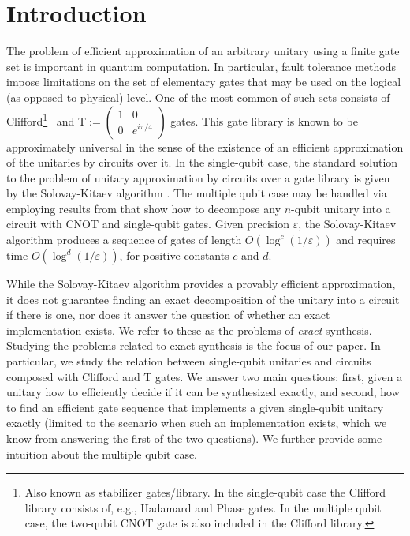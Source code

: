 \documentclass[english,journal]{extarticle}
\theoremstyle{plain}
\theoremstyle{plain}
\theoremstyle{plain}
\theoremstyle{definition}
\theoremstyle{plain}
\theoremstyle{plain}
\begin{document}
\section{Introduction} 
The problem of efficient approximation of an arbitrary unitary using a finite
gate set is important in quantum computation.  In particular,
fault tolerance methods impose limitations on the set of elementary gates that
may be used on the logical (as opposed to physical) level. 
One of the most common of such sets consists of Clifford\footnote{Also known as stabilizer gates/library.  In the single-qubit case the Clifford library consists of, e.g., Hadamard and Phase gates.  In the multiple qubit case, the two-qubit CNOT gate is also included in the Clifford library.} ~and
T$:=\left(\begin{array}{cc}
1 & 0\\
0 & e^{i\pi/4}
\end{array}\right)$ gates.  This gate library is known to be approximately
universal
in the sense of the existence of an efficient approximation of the unitaries by
circuits over it.
In the single-qubit case, the standard solution to the problem of unitary
approximation by circuits over a gate library is given by
the Solovay-Kitaev algorithm \cite{Dawson2008}.  The multiple qubit case may be handled
via employing results from \cite{Barenco1995} that show how to decompose any $n$-qubit
unitary into a circuit with CNOT and single-qubit gates.  Given precision
$\varepsilon$,
the Solovay-Kitaev algorithm produces a sequence of gates of length
$O\left(\log^{c}\left(1/\varepsilon\right)\right)$
and requires time $O\left(\log^{d}\left(1/\varepsilon\right)\right)$, for positive 
constants $c$ and $d$. 

While the Solovay-Kitaev algorithm provides a provably efficient approximation,
it does not guarantee finding an exact decomposition of the unitary into a circuit 
if there is one, nor does it answer the question of whether an exact
implementation
exists.  We refer to these as the problems of {\em exact} synthesis.  
Studying the problems related to exact synthesis is the focus of our paper.  
In particular, we study the relation between single-qubit unitaries and circuits
composed with Clifford and
T gates.  We answer two main questions: first, given a unitary how to
efficiently decide if it can be synthesized exactly, and second, how to find an efficient gate sequence
that implements a given single-qubit unitary exactly (limited to the scenario
when such an implementation exists, which we know from answering the first of
the two questions).  We further provide some intuition about the multiple qubit case.
\end{document}
